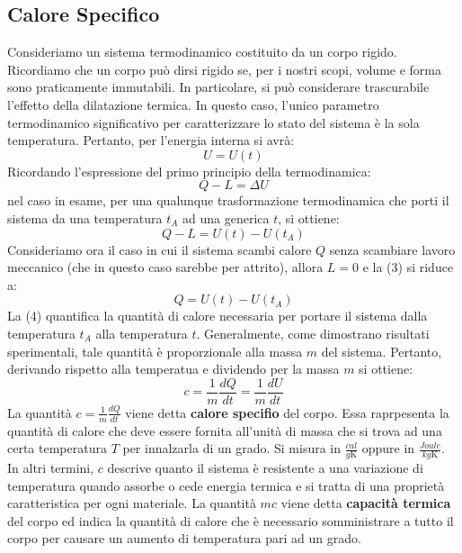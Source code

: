 \subsection{Calore Specifico}
Consideriamo un sistema termodinamico costituito da un corpo rigido. Ricordiamo che un corpo può dirsi rigido se, per i nostri scopi, volume e forma sono praticamente immutabili. In particolare, si può considerare trascurabile l'effetto della dilatazione termica. In questo caso, l'unico parametro termodinamico significativo per caratterizzare lo stato del sistema è la sola temperatura. Pertanto, per l'energia interna si avrà:
\begin{equation}
    U = U(t)
\end{equation}
Ricordando l'espressione del primo principio della termodinamica:
\begin{equation}
    Q -L = \Delta U 
\end{equation}
nel caso in esame, per una qualunque trasformazione termodinamica che porti il sistema da una temperatura $t_A$ ad una generica $t$, si ottiene:
\begin{equation}
    Q - L = U(t) - U(t_A)
\end{equation}
Consideriamo ora il caso in cui il sistema scambi calore $Q$ senza scambiare lavoro meccanico (che in questo caso sarebbe per attrito), allora $L = 0$ e la (3) si riduce a:
\begin{equation}
    Q = U(t) - U(t_A)
\end{equation}
La (4) quantifica la quantità di calore necessaria per portare il sistema dalla temperatura $t_A$ alla temperatura $t$. Generalmente, come dimostrano risultati sperimentali, tale quantità è proporzionale alla massa $m$ del sistema. Pertanto, derivando rispetto alla temperatua e dividendo per la massa $m$ si ottiene:
\begin{equation}
    c = \frac{1}{m}\frac{dQ}{dt} = \frac{1}{m}\frac{dU}{dt}
\end{equation}
La quantità $c = \frac{1}{m}\frac{dQ}{dt}$ viene detta \textbf{calore specifio} del corpo. Essa raprpesenta la quantità di calore che deve essere fornita all'unità di massa che si trova ad una certa temperatura $T$ per innalzarla di un grado. Si misura in $\frac{cal}{g \mathrm{K}}$ oppure in $\frac{Joule}{kg \mathrm{K}}$. In altri termini, $c$ descrive quanto il sistema è resistente a una variazione di temperatura quando assorbe o cede energia termica e si tratta di una proprietà caratteristica per ogni materiale. La quantità $mc$ viene detta \textbf{capacità termica} del corpo ed indica la quantità di calore che è necessario somministrare a tutto il corpo per causare un aumento di temperatura pari ad un grado.

